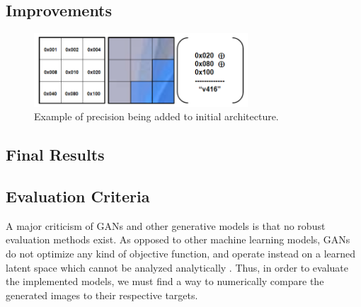 \documentclass[letterpaper]{article} %
\begin{document}
\subsection{Improvements}
\begin{figure}[htbp]
\centerline{\includegraphics[width=8cm]{subdivision.png}}
\caption{Example of precision being added to initial architecture.}
\label{fig:subdivision}
\end{figure}

\subsection{Final Results}
\label{subsec:results}

\subsection{Evaluation Criteria}
A major criticism of GANs and other generative models is that no robust 
evaluation methods exist.
As opposed to other machine learning models, GANs do not optimize any kind of 
objective function,
and operate instead on a learned latent space
which cannot be analyzed analytically \cite{gmm}.
Thus, in order to evaluate the implemented models,
we must find a way to numerically compare the generated images to their 
respective targets.

%
\end{document}
